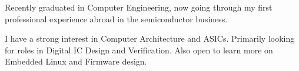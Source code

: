 

\begin{cvparagraph}

Recently graduated in Computer Engineering, now going through my first professional experience abroad in the semiconductor business.

I have a strong interest in Computer Architecture and ASICs. Primarily looking for roles in Digital IC Design and Verification. Also open to learn more on Embedded Linux and Firmware design.

\end{cvparagraph}